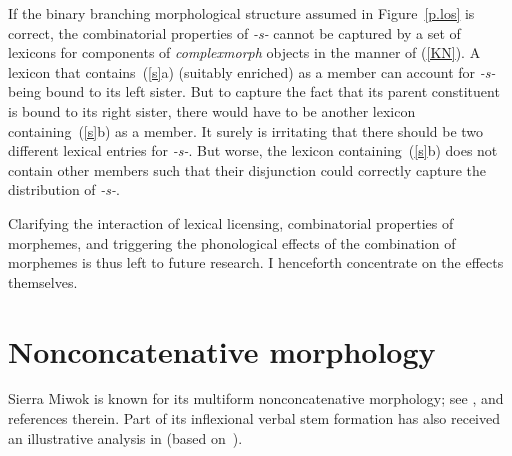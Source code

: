 \documentclass[output=paper]{langsci/langscibook}
\begin{document}
\addlines
If the binary branching morphological structure assumed
in Figure~\ref{p.los} is correct, the combinatorial properties of
\emph{-s-} cannot be captured by a set of lexicons for components of \textit{complexmorph} objects in the manner of (\ref{KN}). A lexicon that
contains~(\ref{s}a) (suitably enriched) as a member can account for \emph{-s-}
being bound to its left sister.  But to capture the fact that its parent
constituent is bound to its right sister, there would have to be another
lexicon containing~(\ref{s}b) as a member.  It surely is irritating that
there should be two different lexical entries for \emph{-s-}. But worse, the
lexicon containing~(\ref{s}b) does not contain other members such that
their disjunction could correctly capture the distribution of \emph{-s-}.
\begin{exe}
\ex
\label{s}
\begin{xlist}
\ex
{}
\ex
{}
\end{xlist}
\end{exe}
%
\enlargethispage{\baselineskip}
\begin{sloppypar}
\noindent
Clarifying the interaction of lexical licensing, combinatorial properties
of morphemes, and triggering the phonological effects of the combination of
morphemes is thus left to future research. I henceforth concentrate on the
effects themselves.
\end{sloppypar}







\section{Nonconcatenative morphology}
\label{sectMiwok}



Sierra Miwok is known for its multiform
nonconcatenative morphology; see \cite{smit:85,smit:86}, \cite{sloa:91} and references therein. Part of its inflexional verbal stem
formation has also received an illustrative  analysis
in \cite{bir:kle:94} (based
on~\citealt[83--95]{gold:90}).
\end{document}
